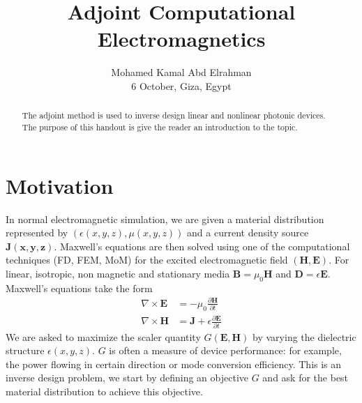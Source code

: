 \documentclass{tufte-handout}
\title{ Adjoint Computational Electromagnetics}
\author[mohamedkamal]{Mohamed Kamal Abd Elrahman \\
6 October, Giza, Egypt}
\begin{document}
	\maketitle
	\begin{abstract}
		\noindent
		 The adjoint method is used to  inverse design linear and nonlinear photonic devices. The purpose of this handout is give the reader an introduction to the topic.   
	\end{abstract}

	\section{Motivation}
	In normal electromagnetic simulation, we are given a material distribution represented by $\left( \epsilon(x,y,z), \mu(x,y,z)\right)  $ and a current density source $\mathbf{J(x,y,z)}$. Maxwell's equations are then solved using one of the computational techniques (FD, FEM, MoM) for the excited electromagnetic field $(\mathbf{H},\mathbf{E})$. For linear, isotropic, non magnetic and stationary media  $\mathbf{B} = \mu_0 \mathbf{H}$ and $\mathbf{D} = \epsilon \mathbf{E}$. Maxwell's equations take the form 
	  \begin{subequations}
	  	\begin{align}
	  		\nabla \times \mathbf{E}  &= - \mu_0 \frac{\partial \mathbf{H}}{\partial t} \\
	    	\nabla \times \mathbf{H}  &= \mathbf{J} +  \epsilon \frac{\partial \mathbf{E}}{\partial t}
	  	\end{align}
	  \end{subequations}
 We are asked to maximize the scaler quantity $G(\mathbf{E},\mathbf{H})$ by varying the dielectric structure $\epsilon(x,y,z)$. $G$ is often a measure of device performance: for example, the power flowing in certain direction or mode conversion efficiency. This is an inverse design problem, we start by defining an objective $G$ and ask for the best material distribution  to achieve this objective. 
 
\end{document}
